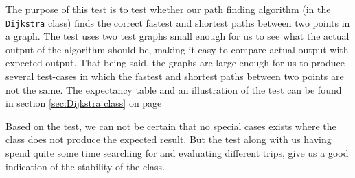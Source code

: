 The purpose of this test is to test whether our path finding algorithm (in the \texttt{Dijkstra} class) finds the correct fastest and shortest paths between two points in a graph. The test uses two test graphs small enough for us to see what the actual output of the algorithm should be, making it easy to compare actual output with expected output. That being said, the graphs are large enough for us to produce several test-cases in which the fastest and shortest paths between two points are not the same. The expectancy table and an illustration of the test can be found in section \ref{sec:Dijkstra class} on page \pageref{sec:Dijkstra class}

Based on the test, we can not be certain that no special cases exists where the class does not produce the expected result. But the test along with us having spend quite some time searching for and evaluating different trips, give us a good indication of the stability of the class.